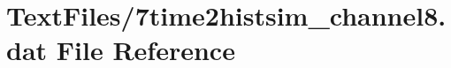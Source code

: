 \hypertarget{7time2histsim__channel8_8dat}{}\section{Text\+Files/7time2histsim\+\_\+channel8.dat File Reference}
\label{7time2histsim__channel8_8dat}
